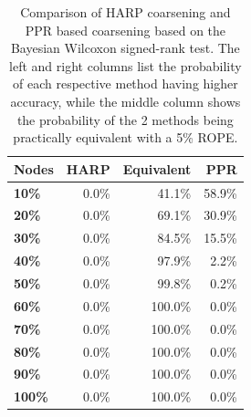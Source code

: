 \begin{table}
  \caption{Comparison of HARP coarsening and PPR based coarsening based on the Bayesian Wilcoxon signed-rank test. The left and right columns list the probability of each respective method having higher accuracy, while the middle column shows the probability of the 2 methods being practically equivalent with a 5\% ROPE.}
  \label{tab:bayesian-harp-ppr}
  \centering
  \begin{tabular}{lrrr}
    \toprule
    \textbf{Nodes} & \textbf{HARP} & \textbf{Equivalent} & \textbf{PPR} \\
    \midrule
    \textbf{10\%}  & 0.0\%         & 41.1\%            & 58.9\%         \\
    \textbf{20\%}  & 0.0\%         & 69.1\%            & 30.9\%         \\
    \textbf{30\%}  & 0.0\%         & 84.5\%            & 15.5\%         \\
    \textbf{40\%}  & 0.0\%         & 97.9\%            & 2.2\%          \\
    \textbf{50\%}  & 0.0\%         & 99.8\%            & 0.2\%          \\
    \textbf{60\%}  & 0.0\%         & 100.0\%           & 0.0\%          \\
    \textbf{70\%}  & 0.0\%         & 100.0\%           & 0.0\%          \\
    \textbf{80\%}  & 0.0\%         & 100.0\%           & 0.0\%          \\
    \textbf{90\%}  & 0.0\%         & 100.0\%           & 0.0\%          \\
    \textbf{100\%} & 0.0\%         & 100.0\%           & 0.0\%          \\
    \bottomrule
  \end{tabular}
\end{table}

